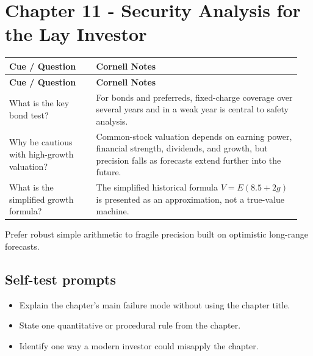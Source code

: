 \documentclass[11pt]{article}
\begin{document}
\section{Chapter 11 - Security Analysis for the Lay Investor}
\begin{longtable}{@{}>{\raggedright\arraybackslash}p{0.29\linewidth}>{\raggedright\arraybackslash}p{0.66\linewidth}@{}}\toprule\textbf{Cue / Question} & \textbf{Cornell Notes}\\\midrule\endfirsthead\toprule\textbf{Cue / Question} & \textbf{Cornell Notes}\\\midrule\endhead
What is the key bond test? & For bonds and preferreds, fixed-charge coverage over several years and in a weak year is central to safety analysis. \\
Why be cautious with high-growth valuation? & Common-stock valuation depends on earning power, financial strength, dividends, and growth, but precision falls as forecasts extend further into the future. \\
What is the simplified growth formula? & The simplified historical formula $V=E(8.5+2g)$ is presented as an approximation, not a true-value machine. \\
\bottomrule\end{longtable}
\begin{principlebox}Prefer robust simple arithmetic to fragile precision built on optimistic long-range forecasts.\end{principlebox}
\subsection*{Self-test prompts}\begin{itemize}\item Explain the chapter's main failure mode without using the chapter title.\item State one quantitative or procedural rule from the chapter.\item Identify one way a modern investor could misapply the chapter.\end{itemize}
\end{document}
